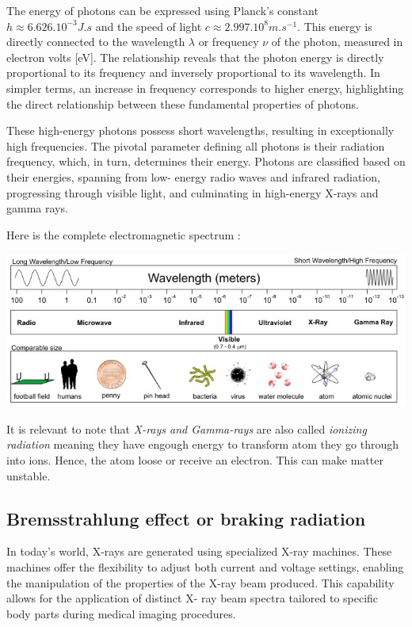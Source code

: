 \documentclass[a4paper,12pt]{report}
\begin{document}
The energy of photons can be expressed using Planck's constant \(h \approx 6.626.10^{-3} J.s\) and the
speed of light \(c \approx 2.997.10^8 m.s^{-1}\). This energy is directly connected to the wavelength \(\lambda\) or
frequency \(\nu\) of the photon, measured in electron volts [eV]. The relationship reveals that the
photon energy is directly proportional to its frequency and inversely proportional to its
wavelength. In simpler terms, an increase in frequency corresponds to higher energy, highlighting
the direct relationship between these fundamental properties of photons.

These high-energy photons possess short wavelengths, resulting in exceptionally high
frequencies. The pivotal parameter defining all photons is their radiation frequency, which, in
turn, determines their energy. Photons are classified based on their energies, spanning from low-
energy radio waves and infrared radiation, progressing through visible light, and culminating in
high-energy X-rays and gamma rays.
\newpage

Here is the complete electromagnetic spectrum :
\begin{center}
\includegraphics[scale = 2.4]{elecSpec.jpg}

\label{elecSpec}
\end{center}

It is relevant to note that \textit{X-rays and Gamma-rays} are also called \textit{ionizing radiation} meaning they have engough energy to transform atom they go through into ions. Hence, the atom loose or receive an electron. This can make matter unstable.

\subsection*{Bremsstrahlung effect or braking radiation}

In today's world, X-rays are generated using specialized X-ray machines. These machines offer
the flexibility to adjust both current and voltage settings, enabling the manipulation of the
properties of the X-ray beam produced. This capability allows for the application of distinct X-
ray beam spectra tailored to specific body parts during medical imaging procedures.
\end{document}
